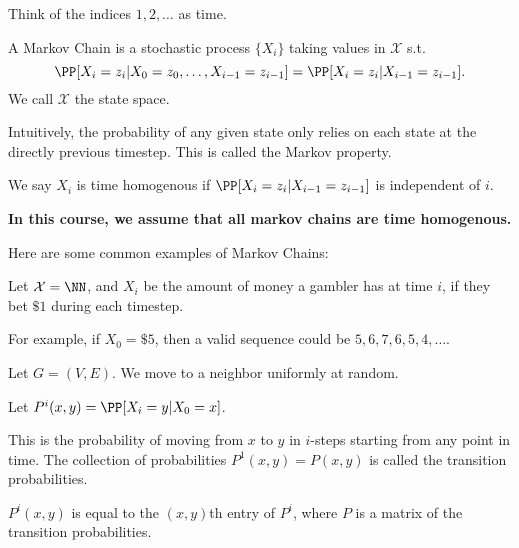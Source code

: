 Think of the indices $1,2,\hdots$ as time. 

\begin{definition}

A \ac{Markov Chain} is a stochastic process $\{X_i\}$ taking values in $\mathcal{X}$ s.t. 
\[\PP[X_i=z_i | X_0=z_0,\hdots, X_{i-1} = z_{i-1}] = \PP[X_i=z_i | X_{i-1} = z_{i-1}].\] 
We call $\mathcal{X}$ the \ac{state space}. 
\end{definition}

Intuitively, the probability of any given state only relies on each state at the directly previous timestep. This is called the \ac{Markov property}. 

\begin{definition}

We say $X_i$ is \ac{time homogenous} if $\PP[X_i = z_i | X_{i-1} = z_{i-1}]$ is independent of $i$. 
\end{definition}

\noindent \textbf{In this course, we assume that all markov chains are time homogenous.}

\noindent Here are some common examples of Markov Chains: 

\begin{example}

Let $\mathcal{X} = \NN$, and $X_i$ be the amount of money a gambler has at time $i$, if they bet $\$1$ during each timestep. 
\end{example}

For example, if $X_0 = \$5$, then a valid sequence could be $5,6,7,6,5,4,\hdots$. 

\begin{example}

Let $G=(V,E)$. We move to a neighbor uniformly at random. 
\end{example}

\begin{definition}

Let $P^i(x,y) = \PP[X_i=y|X_0=x]$. 
\end{definition}

This is the probability of moving from $x$ to $y$ in $i$-steps starting from any point in time. The collection of probabilities $P^1(x,y) = P(x,y)$ is called the \ac{transition probabilities}. 

\begin{theorem}
\lemlabel

$P^i(x,y)$ is equal to the $(x,y)$th entry of $P^i$, where $P$ is a matrix of the transition probabilities. 
\end{theorem}

